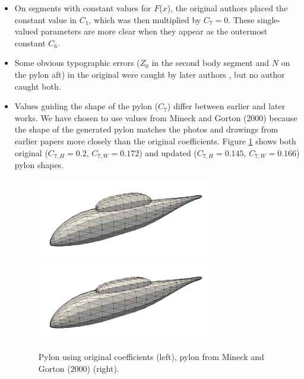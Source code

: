 \documentclass[journal]{new-aiaa}
\begin{document}
\begin{itemize}
\item On segments with constant values for $F$($x$), the original authors placed the constant value in $C_{1}$,
which was then multiplied by $C_{7} = 0$.
These single-valued parameters are more clear when they appear as the outermost constant $C_{6}$.
\item Some obvious typographic errors ($Z_0$ in the second body segment and $N$ on the pylon aft)
in the original \cite{nasa80051} were caught by later authors \cite{nasa87762,mineckgorton}, but no author caught both.
\item Values guiding the shape of the pylon ($C_{7}$) differ between earlier and later works.
We have chosen to use values from Mineck and Gorton (2000) \cite{mineckgorton} because the shape of the generated 
pylon matches the photos and drawings from earlier papers more closely \cite{nasa80051,nasa87762} than the original coefficients.
Figure \ref{badpylon} shows both original ($C_{7,H} = 0.2$, $C_{7,W} = 0.172$) and
updated ($C_{7,H} = 0.145$, $C_{7,W} = 0.166$) pylon shapes.
\begin{figure} \begin{centering}
\includegraphics[width=3.0in]{img_badpylon.png}
\includegraphics[width=3.0in]{img_good.png}
\caption{Pylon using original coefficients (left), pylon from Mineck and Gorton (2000) \cite{mineckgorton} (right).}
\label{badpylon}
\end{centering}\end{figure}%
\end{itemize}
\end{document}
